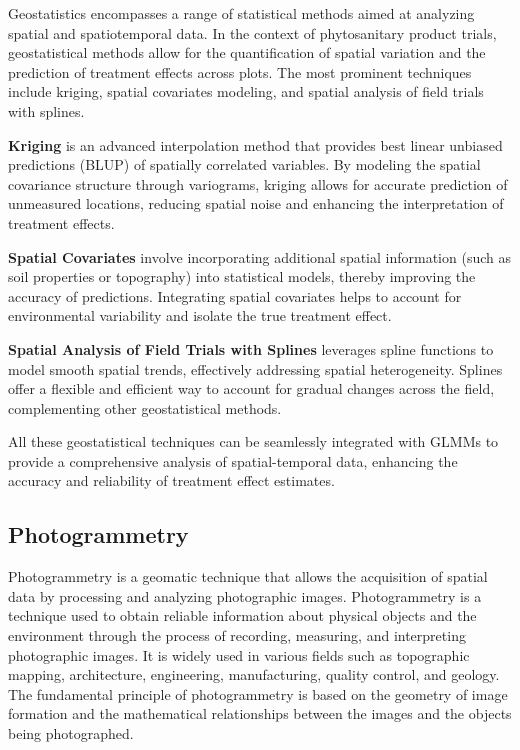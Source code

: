 \documentclass[12pt,a4paper,oneside]{report}
\begin{document}
Geostatistics encompasses a range of statistical methods aimed at analyzing
spatial and spatiotemporal data. In the context of phytosanitary product trials,
geostatistical methods allow for the quantification of spatial variation and the
prediction of treatment effects across plots. The most prominent techniques
include kriging, spatial covariates modeling, and spatial analysis of field trials
with splines.

\textbf{Kriging} is an advanced interpolation method that provides best linear
unbiased predictions (BLUP) of spatially correlated variables. By modeling the
spatial covariance structure through variograms, kriging allows for accurate
prediction of unmeasured locations, reducing spatial noise and enhancing the
interpretation of treatment effects.

\textbf{Spatial Covariates} involve incorporating additional spatial information
(such as soil properties or topography) into statistical models, thereby
improving the accuracy of predictions. Integrating spatial covariates helps to
account for environmental variability and isolate the true treatment effect.

\textbf{Spatial Analysis of Field Trials with Splines} leverages spline functions
to model smooth spatial trends, effectively addressing spatial heterogeneity.
Splines offer a flexible and efficient way to account for gradual changes across
the field, complementing other geostatistical methods.

All these geostatistical techniques can be seamlessly integrated with GLMMs to
provide a comprehensive analysis of spatial-temporal data, enhancing the accuracy and
reliability of treatment effect estimates.


\subsection{Photogrammetry}

Photogrammetry is a geomatic technique that allows the acquisition of spatial
data by processing and analyzing photographic images. 
Photogrammetry is a technique used to obtain reliable information about physical 
objects and the environment through the process of recording, measuring, and interpreting 
photographic images. It is widely used in various fields such as topographic mapping, 
architecture, engineering, manufacturing, quality control, and geology. The fundamental 
principle of photogrammetry is based on the geometry of image formation and the 
mathematical relationships between the images and the objects being photographed.
\end{document}
